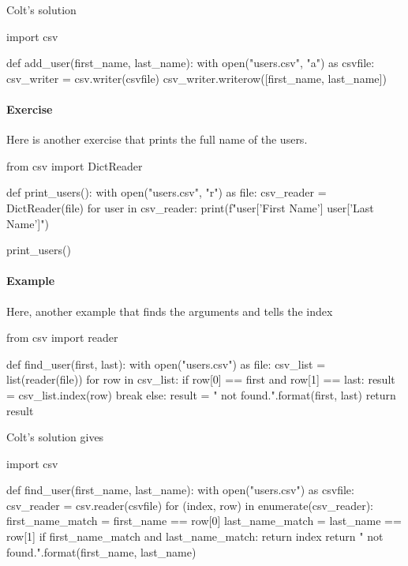 Colt's solution
\begin{listing}{1}
import csv

def add_user(first_name, last_name):
    with open("users.csv", "a") as csvfile:
        csv_writer = csv.writer(csvfile)
        csv_writer.writerow([first_name, last_name])    
\end{listing}

\paragraph{Exercise} Here is another exercise that prints the full name of the users. 
\begin{listing}{1}
from csv import DictReader

def print_users():
    with open("users.csv", "r") as file:
        csv_reader = DictReader(file)
        for user in csv_reader:
            print(f"{user['First Name']} {user['Last Name']}")

print_users()    
\end{listing}

\paragraph{Example}

Here, another example that finds the arguments and tells the index
\begin{listing}{1}
from csv import reader

def find_user(first, last):
    with open("users.csv") as file:
        csv_list = list(reader(file))
        for row in csv_list:
            if row[0] == first and row[1] == last:
                result = csv_list.index(row)
                break
            else:
                result = "{} {} not found.".format(first, last)
    return result    
\end{listing}

Colt's solution gives
\begin{listing}{1}
import csv

def find_user(first_name, last_name):
    with open("users.csv") as csvfile:
        csv_reader = csv.reader(csvfile)
        for (index, row) in enumerate(csv_reader):
            first_name_match = first_name == row[0]
            last_name_match = last_name == row[1]
            if first_name_match and last_name_match:
                return index
        return "{} {} not found.".format(first_name, last_name)    
\end{listing}

